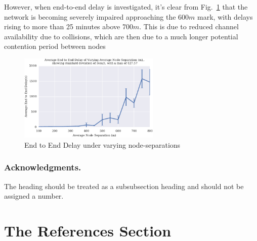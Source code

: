 \documentclass[runningheads,a4paper]{llncs}
\begin{document}
However, when end-to-end delay is investigated, it's clear from Fig.~\ref{fig:delay_range} that the network is becoming severely impaired approaching the 600$m$ mark, with delays rising to more than 25 minutes above 700$m$.
This is due to reduced channel availability due to collisions, which are then due to a much longer potential contention period between nodes 

\begin{figure}[H]
  \centering
  \includegraphics[width=0.6\textwidth]{img/delay_range.pdf}
  \caption{End to End Delay under varying node-separations}
  \label{fig:delay_range}
\end{figure}

\begin{table}[H]
  \caption{Tabular view of data from Figs~\ref{fig:prod_breakdown_range} and \ref{fig:delay_range}} \label{tab:rangedelay}
  \begin{center}
      
  \end{center}
\end{table}



\subsubsection*{Acknowledgments.} The heading should be treated as a
subsubsection heading and should not be assigned a number.

\section{The References Section}\label{references}
\end{document}
